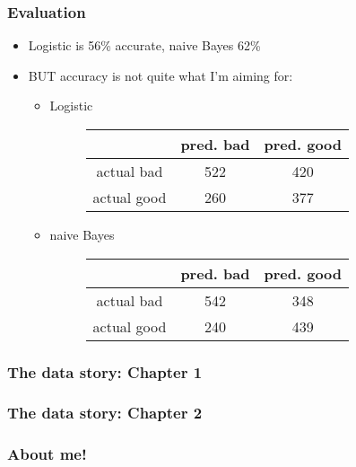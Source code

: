 \documentclass{beamer}
\begin{document}
\begin{frame}
\frametitle{Evaluation}

\begin{itemize}
\item Logistic is 56\% accurate, naive Bayes 62\%
\pause
\item BUT accuracy is not quite what I'm aiming for:
\pause
\begin{itemize}
\item Logistic
\begin{figure}
\begin{tabular}{c|cc}
& pred. bad & pred. good \\
\hline
actual bad &  522 &  420 \\
actual good &  260 &  377
\end{tabular}
\end{figure}
\pause
\item naive Bayes
\begin{figure}
\begin{tabular}{c|cc}
& pred. bad & pred. good \\
\hline
actual bad &  542 &  348 \\
actual good &  240 &  439
\end{tabular}
\end{figure}
\end{itemize}
\end{itemize}



\end{frame}

\begin{frame}
\frametitle{The data story: Chapter 1}

\begin{figure}[h]
\centering
{}
\end{figure}

\end{frame}


\begin{frame}
\frametitle{The data story: Chapter 2}

\begin{figure}[h]
\centering
{}
\end{figure}

\end{frame}

\begin{frame}
\frametitle{About me!}

\begin{figure}[h]
\centering
{}
\end{figure}

\end{frame}
\end{document}
